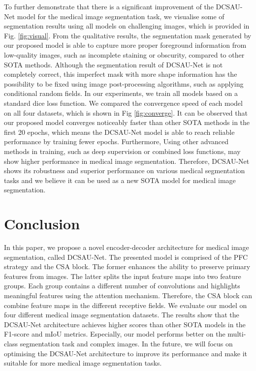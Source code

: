 \documentclass[a4paper,fleqn]{cas-dc}
\begin{document}
To further demonstrate that there is a significant improvement of the DCSAU-Net model for the medical image segmentation task, we visualise some of segmentation results using all models on challenging images, which is provided in Fig. \ref{fig:visual}. From the qualitative results, the segmentation mask generated by our proposed model is able to capture more proper foreground information from low-quality images, such as incomplete staining or obscurity, compared to other SOTA methods. Although the segmentation result of DCSAU-Net is not completely correct, this imperfect mask with more shape information has the possibility to be fixed using image post-processing algorithms, such as applying conditional random fields. In our experiments, we train all models based on a standard dice loss function. We compared the convergence speed of each model on all four datasets, which is shown in Fig \ref{fig:converge}. It can be observed that our proposed model converges noticeably faster than other SOTA methods in the first 20 epochs, which means the DCSAU-Net model is able to reach reliable performance by training fewer epochs. Furthermore, Using other advanced methods in training, such as deep supervision or combined loss functions, may show higher performance in medical image segmentation. Therefore, DCSAU-Net shows its robustness and superior performance on various medical segmentation tasks and we believe it can be used as a new SOTA model for medical image segmentation.
\section{Conclusion}
\label{sec:col}
In this paper, we propose a novel encoder-decoder architecture for medical image segmentation, called DCSAU-Net. The presented model is comprised of the PFC strategy and the CSA block. The former enhances the ability to preserve primary features from images. The latter splits the input feature maps into two feature groups. Each group contains a different number of convolutions and highlights meaningful features using the attention mechanism. Therefore, the CSA block can combine feature maps in the different receptive fields. We evaluate our model on four different medical image segmentation datasets. The results show that the DCSAU-Net architecture achieves higher scores than other SOTA models in the F1-score and mIoU metrics. Especially, our model performs better on the multi-class segmentation task and complex images. In the future, we will focus on optimising the DCSAU-Net architecture to improve its performance and make it suitable for more medical image segmentation tasks.


\printcredits
\nocite{*} 




\end{document}
